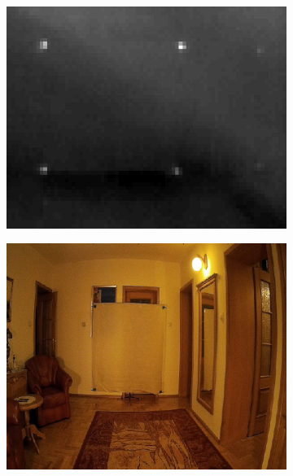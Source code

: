 \begin{figure}[h]
	\centering
	\begin{subfigure}{0.47\textwidth}
		\centering
		\includegraphics[width=0.9\linewidth]{images/calibrationThermal}
		\subcaption{\label{fig:calibrationThermal}}
	\end{subfigure}
	\begin{subfigure}{0.47\textwidth}
		\centering
		\includegraphics[width=0.9\linewidth]{images/calibrationRGB}
		\subcaption{\label{fig:calibrationRGB}}
	\end{subfigure}
	\begin{subfigure}{0.47\textwidth}
		\centering

\end{subfigure}
\end{figure}
